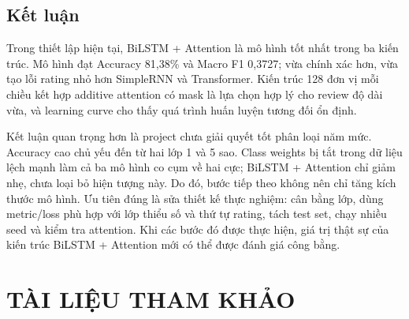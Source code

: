 \documentclass[12pt]{report}
\begin{document}
\section{Kết luận}

Trong thiết lập hiện tại, BiLSTM + Attention là mô hình tốt nhất trong ba kiến
trúc. Mô hình đạt Accuracy 81,38\% và Macro F1 0,3727; vừa
chính xác hơn, vừa tạo lỗi rating nhỏ hơn SimpleRNN và Transformer. Kiến trúc
128 đơn vị mỗi chiều kết hợp additive attention có mask là lựa chọn hợp lý cho
review độ dài vừa, và learning curve cho thấy quá trình huấn luyện tương đối ổn
định.

Kết luận quan trọng hơn là project chưa giải quyết tốt phân loại năm mức.
Accuracy cao chủ yếu đến từ hai lớp 1 và 5 sao. Class weights bị tắt trong dữ
liệu lệch mạnh làm cả ba mô hình co cụm về hai cực; BiLSTM + Attention chỉ giảm
nhẹ, chưa loại bỏ hiện tượng này. Do đó, bước tiếp theo không nên chỉ tăng kích
thước mô hình. Ưu tiên đúng là sửa thiết kế thực nghiệm: cân bằng lớp, dùng
metric/loss phù hợp với lớp thiểu số và thứ tự rating, tách test set, chạy nhiều
seed và kiểm tra attention. Khi các bước đó được thực hiện, giá trị thật sự của
kiến trúc BiLSTM + Attention mới có thể được đánh giá công bằng.



\chapter*{TÀI LIỆU THAM KHẢO}
\end{document}
